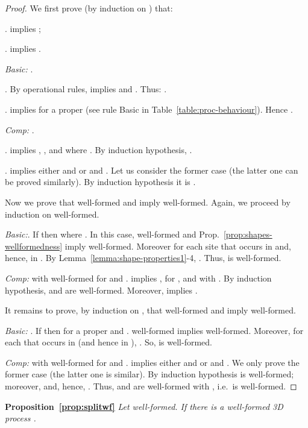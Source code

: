 \documentclass[11pt]{article}
\def\name#1{\mbox{\sc #1}}
\begin{document}
\smallskip\noindent\begin{proof}
We first prove (by induction on ) that:

\par\medskip{}.  implies ;

\par\medskip{}.  implies .

\par\medskip\noindent
{\em Basic:} .

. By operational rules,  implies  and . Thus:
.

.  implies  for a proper  (see rule \name{Basic}
in Table~\ref{table:proc-behaviour}). Hence .

\par\bigskip\noindent
{\em Comp:} .

.  implies , , and  where .
By induction hypothesis,  .

.  implies either  and  or  and . Let us consider the former case
(the latter one can be proved similarly). By induction hypothesis it is .

\par\medskip\noindent
Now we prove that  well-formed and  imply  well-formed. Again, we proceed by
induction on  well-formed.
\par\medskip\noindent
{\em Basic:}. If  then  where . In this
case,  well-formed and Prop.~\ref{prop:shapes-wellformedness}
imply  well-formed. Moreover  for each site  that occurs in  and, hence, in . By
Lemma~\ref{lemma:shape-properties1}-4,  . Thus,  
is well-formed.

\par\medskip\noindent
{\em Comp:}  with  well-formed for  and .
 implies , for , and  with
. By induction hypothesis,  and  are well-formed.
Moreover,  implies .

\par\medskip\noindent
It remains to prove, by induction on , that  well-formed and  imply  well-formed. 

\par\medskip\noindent
{\em Basic:} .
If  then  for a proper  and .  well-formed
implies  well-formed. Moreover, for each  that occurs in  (and hence in ),
. So, 
is well-formed.
\par\medskip\noindent
{\em Comp:}  with  well-formed for  and .
 implies either  and  or  and . We only prove the former case (the latter one is
similar). By induction hypothesis  is well-formed; moreover,  and,
hence, .
Thus,  and  are well-formed with , i.e.\  is well-formed.
\end{proof}
\par\medskip\noindent
{\bf Proposition~\ref{prop:splitwf}}
\em Let  well-formed. If  there is a well-formed 3D
process .\rm
\end{document}
